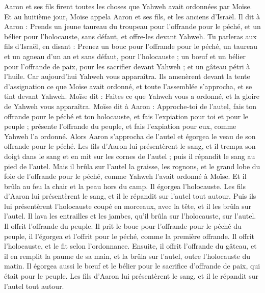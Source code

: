 \begin{multicols}{2}
Aaron et ses fils firent toutes les choses que Yahweh avait ordonnées par Moïse.
\VerseOne{}Et au huitième jour, Moïse appela Aaron et ses fils, et les anciens d'Israël.
Il dit à Aaron : Prends un jeune taureau du troupeau pour l'offrande pour le péché, et un bélier pour l'holocauste, sans défaut, et offre-les devant Yahweh.
Tu parleras aux fils d'Israël, en disant : Prenez un bouc pour l'offrande pour le péché, un taureau et un agneau d'un an et sans défaut, pour l'holocauste ;
un bœuf et un bélier pour l’offrande de paix, pour les sacrifier devant Yahweh ; et un gâteau pétri à l'huile. Car aujourd'hui Yahweh vous apparaîtra.
Ils amenèrent devant la tente d'assignation ce que Moïse avait ordonné, et toute l'assemblée s'approcha, et se tint devant Yahweh.
Moïse dit : Faites ce que Yahweh vous a ordonné, et la gloire de Yahweh vous apparaîtra.
Moïse dit à Aaron : Approche-toi de l'autel, fais ton offrande pour le péché et ton holocauste, et fais l’expiation pour toi et pour le peuple ; présente l'offrande du peuple, et fais l’expiation pour eux, comme Yahweh l'a ordonné.
Alors Aaron s'approcha de l'autel et égorgea le veau de son offrande pour le péché.
Les fils d'Aaron lui présentèrent le sang, et il trempa son doigt dans le sang et en mit sur les cornes de l'autel ; puis il répandit le sang au pied de l'autel.
Mais il brûla sur l'autel la graisse, les rognons, et le grand lobe du foie de l'offrande pour le péché, comme Yahweh l'avait ordonné à Moïse.
Et il brûla au feu la chair et la peau hors du camp.
Il égorgea l'holocauste. Les fils d'Aaron lui présentèrent le sang, et il le répandit sur l'autel tout autour.
Puis ils lui présentèrent l'holocauste coupé en morceaux, avec la tête, et il les brûla sur l'autel.
Il lava les entrailles et les jambes, qu'il brûla sur l'holocauste, sur l'autel.
Il offrit l'offrande du peuple. Il prit le bouc pour l'offrande pour le péché du peuple, il l'égorgea et l'offrit pour le péché, comme la première offrande.
Il offrit l’holocauste, et le fit selon l'ordonnance.
Ensuite, il offrit l’offrande du gâteau, et il en remplit la paume de sa main, et la brûla sur l'autel, outre l'holocauste du matin.
Il égorgea aussi le bœuf et le bélier pour le sacrifice d’offrande de paix, qui était pour le peuple. Les fils d'Aaron lui présentèrent le sang, et il le répandit sur l'autel tout autour.

\end{multicols}

